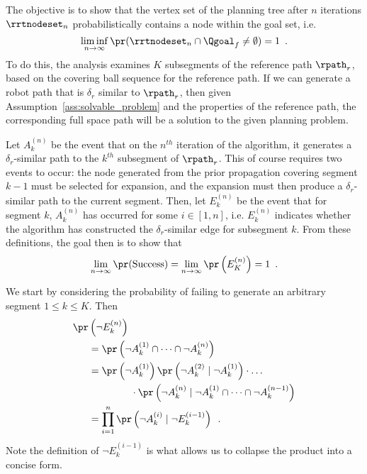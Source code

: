 The objective is to show that the vertex set of the planning tree after $n$ iterations $\rrtnodeset_n$ probabilistically contains a node within the goal set, i.e.
\begin{equation}
    \liminf_{n \rightarrow \infty} \pr( \rrtnodeset_n \cap \Qgoal_f \neq \emptyset ) = 1 \enspace .
\end{equation}
To do this, the analysis examines $K$ subsegments of the reference path $\rpath_r$, based on the covering ball sequence for the reference path. If we can generate a robot path that is $\delta_r$ similar to $\rpath_r$, then given Assumption~\ref{ass:solvable_problem} and the properties of the reference path, the corresponding full space path will be a solution to the given planning problem.

Let $A_k^{(n)}$ be the event that on the $n^{th}$ iteration of the algorithm, it generates a $\delta_r$-similar path to the $k^{th}$ subsegment of $\rpath_r$.  This of course requires two events to occur: the node generated from the prior propagation covering segment $k-1$ must be selected for expansion, and the expansion must then produce a $\delta_r$-similar path to the current segment.  Then, let $E_k^{(n)}$ be the event that for segment $k$, $A_k^{(n)}$ has occurred for some $i \in [1,n]$, i.e. $E_k^{(n)}$ indicates whether the algorithm has constructed the $\delta_r$-similar edge for subsegment $k$. From these definitions, the goal then is to show that
\begin{equation}
    \lim_{n \rightarrow \infty} \pr(\textrm{Success}) = \lim_{n \rightarrow \infty} \pr\left( E^{(n)}_K \right) = 1 \enspace.
    \label{eqn:initial_pr_limit}
\end{equation}

We start by considering the probability of failing to generate an arbitrary segment $1 \leq k \leq K$. Then 
\begin{equation}
\begin{split}
    \pr&\left( \neg E^{(n)}_k \right) \\
       &= \pr\left( \neg A^{(1)}_k \cap \dots \cap \neg A^{(n)}_k \right) \\
       &= \pr\left( \neg A^{(1)}_k \right) \pr\left( \neg A^{(2)}_k \mid \neg A^{(1)}_k \right) \cdot \dots \\
       &\hspace{1.5cm} \cdot \pr\left( \neg A^{(n)}_k \mid \neg A^{(1)}_k \cap \dots \cap \neg A^{(n-1)}_k \right) \\
       &= \prod_{i=1}^n \pr\left( \neg A^{(i)}_k \mid \neg E^{(i-1)}_k \right) \enspace .
\end{split}
\label{eqn:fail_enk}
\end{equation}
Note the definition of $\neg E^{(i-1)}_k$ is what allows us to collapse the product into a concise form.


